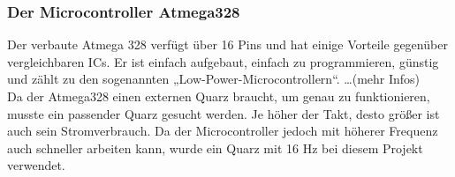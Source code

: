 \subsubsection{Der Microcontroller Atmega328}
Der verbaute Atmega 328 verfügt über 16 Pins und hat einige Vorteile gegenüber vergleichbaren ICs. Er ist einfach aufgebaut, einfach zu programmieren, günstig und zählt zu den sogenannten „Low-Power-Microcontrollern“. …(mehr Infos) \\
Da der Atmega328 einen externen Quarz braucht, um genau zu funktionieren, musste ein passender Quarz gesucht werden. Je höher der Takt, desto größer ist auch sein Stromverbrauch. Da der Microcontroller jedoch mit höherer Frequenz auch schneller arbeiten kann, wurde ein Quarz mit 16 Hz bei diesem Projekt verwendet. 
